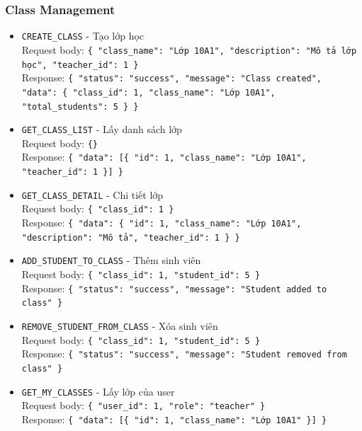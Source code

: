 \documentclass[12pt,a4paper]{report}
\newcommand{\json}[1]{\texttt{\allowbreak#1\allowbreak}}
\begin{document}
\subsubsection{Class Management}
\begin{itemize}
    \item \texttt{CREATE\_CLASS} - Tạo lớp học \\
    Request body: \json{\{ "class\_name": "Lớp 10A1", "description": "Mô tả lớp học", "teacher\_id": 1 \}} \\
    Response: \json{\{ "status": "success", "message": "Class created", "data": \{ "class\_id": 1, "class\_name": "Lớp 10A1", "total\_students": 5 \} \}}
    \item \texttt{GET\_CLASS\_LIST} - Lấy danh sách lớp \\
    Request body: \json{\{\}} \\
    Response: \json{\{ "data": [\{ "id": 1, "class\_name": "Lớp 10A1", "teacher\_id": 1 \}] \}}
    \item \texttt{GET\_CLASS\_DETAIL} - Chi tiết lớp \\
    Request body: \json{\{ "class\_id": 1 \}} \\
    Response: \json{\{ "data": \{ "id": 1, "class\_name": "Lớp 10A1", "description": "Mô tả", "teacher\_id": 1 \} \}}
    \item \texttt{ADD\_STUDENT\_TO\_CLASS} - Thêm sinh viên \\
    Request body: \json{\{ "class\_id": 1, "student\_id": 5 \}} \\
    Response: \json{\{ "status": "success", "message": "Student added to class" \}}
    \item \texttt{REMOVE\_STUDENT\_FROM\_CLASS} - Xóa sinh viên \\
    Request body: \json{\{ "class\_id": 1, "student\_id": 5 \}} \\
    Response: \json{\{ "status": "success", "message": "Student removed from class" \}}
    \item \texttt{GET\_MY\_CLASSES} - Lấy lớp của user \\
    Request body: \json{\{ "user\_id": 1, "role": "teacher" \}} \\
    Response: \json{\{ "data": [\{ "id": 1, "class\_name": "Lớp 10A1" \}] \}}
\end{itemize}
\end{document}
